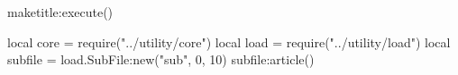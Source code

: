 \documentclass[11pt, a4paper]{ltjsarticle}
\begin{document}
    \begin{luacode*}
        maketitle:execute()
    \end{luacode*}

    \tableofcontents

    \begin{luacode*}
        local core = require("../utility/core")
        local load = require("../utility/load")
        local subfile = load.SubFile:new("sub", 0, 10)
        subfile:article()
    \end{luacode*}

    
    
\end{document}
